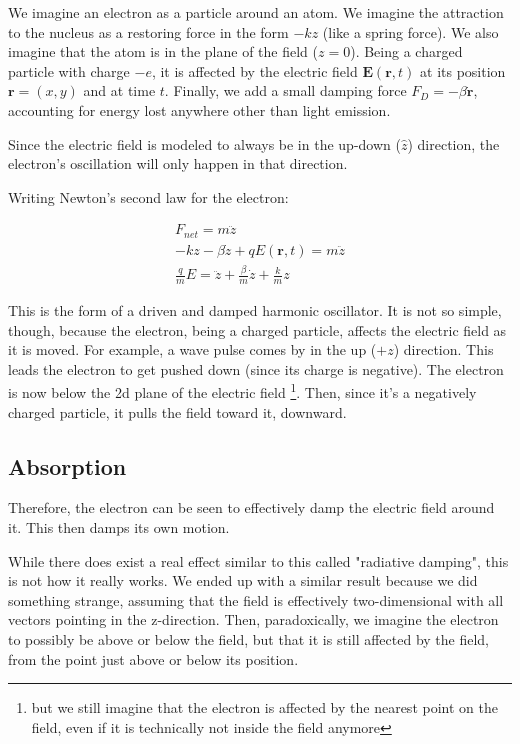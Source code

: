 \documentclass{article}
\begin{document}
We imagine an electron as a particle around an atom. We imagine the attraction to the nucleus as a restoring force in the form $-kz$ (like a spring force). We also imagine that the atom is in the plane of the field ($z=0$). Being a charged particle with charge $-e$, it is affected by the electric field $\mathbf{E}(\mathbf{r}, t)$ at its position $\mathbf{r} = (x, y)$ and at time $t$. Finally, we add a small damping force $F_D = -\beta \mathbf{\dot{r}}$, accounting for energy lost anywhere other than light emission.

Since the electric field is modeled to always be in the up-down ($\hat{z}$) direction, the electron's oscillation will only happen in that direction.

Writing Newton's second law for the electron:

\begin{eqnarray}
    F_{net}= m \ddot{z}
    \\
    -kz -\beta\dot{z} + q E(\mathbf{r}, t) = m \ddot{z}
    \\
    \frac{q}{m} E = \ddot{z} +\frac{\beta}{m} \dot{z} + \frac{k}{m}z
\end{eqnarray}

This is the form of a driven and damped harmonic oscillator. It is not so simple, though, because the electron, being a charged particle, affects the electric field as it is moved. For example, a wave pulse comes by in the up ($+z$) direction. This leads the electron to get pushed down (since its charge is negative). The electron is now below the 2d plane of the electric field \footnote{but we still imagine that the electron is affected by the nearest point on the field, even if it is technically not inside the field anymore}. Then, since it's a negatively charged particle, it pulls the field toward it, downward.

\subsection{Absorption}

Therefore, the electron can be seen to effectively damp the electric field around it. This then damps its own motion.

While there does exist a real effect similar to this called "radiative damping", this is not how it really works. We ended up with a similar result because we did something strange, assuming that the field is effectively two-dimensional with all vectors pointing in the z-direction. Then, paradoxically, we imagine the electron to possibly be above or below the field, but that it is still affected by the field, from the point just above or below its position.
\end{document}
